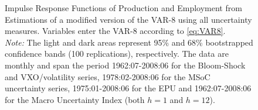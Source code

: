 \documentclass[a4paper,11pt,listof=nochaptergap,oneside,pointednumbers,bibtotoc,bigheadings,liststotoc]{scrbook}
\theoremstyle{mysatz}
\theoremstyle{mydefinition}
\theoremstyle{mybemerkung}
\begin{document}
\begin{itemize}
\begin{figure}[!h]
   \centering
   \setlength\fboxsep{0pt}
   \setlength\fboxrule{0pt}
      \caption[Impulse Response Functions of Production and Employment from Estimations of a modified version of the VAR-8 following \citet{bloom:09} using all uncertainty measures.]{Impulse Response Functions of Production and Employment from Estimations of a modified version of the VAR-8 \citet{bloom:09} using all uncertainty measures. Variables enter the VAR-8 according to \ref{eq:VAR8}.\\
       \textit{Note:} The light and dark areas represent 95\% and 68\% bootstrapped confidence bands (100 replications), respectively. The data are monthly and span the period 1962:07-2008:06 for the Bloom-Shock and VXO/volatility series, 1978:02-2008:06 for the MSoC uncertainty series, 1975:01-2008:06 for the EPU and 1962:07-2008:06 for the Macro Uncertainty Index (both $h=1$ and $h=12$).}   \label{fig:VAR8_NoHP_until2008}
\end{figure}


\end{itemize}
\end{document}
